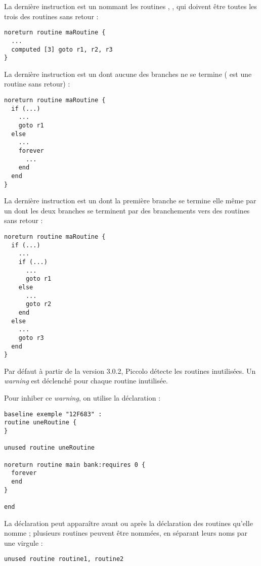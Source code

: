 La dernière instruction est un  nommant les routines , ,  qui doivent être toutes les trois des routines sans retour :
\begin{lstlisting}[language=piccolo]
noreturn routine maRoutine {
  ...
  computed [3] goto r1, r2, r3
}
\end{lstlisting}

La dernière instruction est un  dont aucune des branches ne se termine ( est une routine sans retour) :
\begin{lstlisting}[language=piccolo]
noreturn routine maRoutine {
  if (...)
    ...
    goto r1
  else
    ...
    forever
      ...
    end
  end
}

\end{lstlisting}


La dernière instruction est un  dont la première branche se termine elle même par un  dont les deux branches se terminent par des branchements vers des routines sans retour :
\begin{lstlisting}[language=piccolo]
noreturn routine maRoutine {
  if (...)
    ...
    if (...)
      ...
      goto r1
    else
      ...
      goto r2
    end
  else
    ...
    goto r3
  end
}
\end{lstlisting}






Par défaut à partir de la version 3.0.2, Piccolo détecte les routines inutilisées. Un \emph{warning} est déclenché pour chaque routine inutilisée.

Pour inhiber ce \emph{warning}, on utilise la déclaration  :

\begin{lstlisting}[language=piccolo]
baseline exemple "12F683" :
routine uneRoutine {
}

unused routine uneRoutine
 
noreturn routine main bank:requires 0 {
  forever
  end
}

end
\end{lstlisting}

La déclaration  peut apparaître avant ou après la déclaration des routines qu'elle nomme ; plusieurs routines peuvent être nommées, en séparant leurs noms par une virgule :
\begin{lstlisting}[language=piccolo]
unused routine routine1, routine2
\end{lstlisting}








